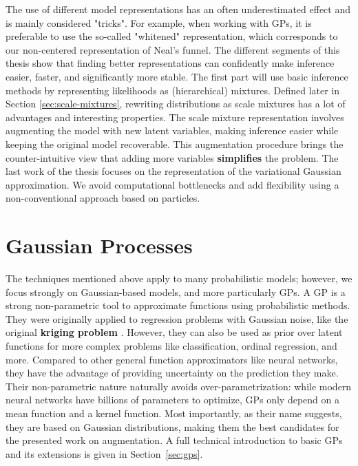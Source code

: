 The use of different model representations has an often underestimated effect and is mainly considered "tricks".
For example, when working with \acf{GPs}, it is preferable to use the so-called "whitened" representation, which corresponds to our non-centered representation of Neal's funnel.
The different segments of this thesis show that finding better representations can confidently make inference easier, faster, and significantly more stable. 
The first part will use basic inference methods by representing likelihoods as (hierarchical) mixtures.
Defined later in Section \ref{sec:scale-mixtures}, rewriting distributions as scale mixtures has a lot of advantages and interesting properties.
The scale mixture representation involves augmenting the model with new latent variables, making inference easier while keeping the original model recoverable.
This augmentation procedure brings the counter-intuitive view that adding more variables \textbf{simplifies} the problem.
The last work of the thesis focuses on the representation of the variational Gaussian approximation.
We avoid computational bottlenecks and add flexibility using a non-conventional approach based on particles.

\section{Gaussian Processes}

The techniques mentioned above apply to many probabilistic models; however, we focus strongly on Gaussian-based models, and more particularly \acf{GPs}.
A \ac{GP} is a strong non-parametric tool to approximate functions using probabilistic methods.
They were originally applied to regression problems with Gaussian noise, like the original \textbf{kriging problem} \cite{cressie1990origins}. However, they can also be used as prior over latent functions for more complex problems like classification, ordinal regression, and more.
Compared to other general function approximators like neural networks, they have the advantage of providing uncertainty on the prediction they make.
Their non-parametric nature naturally avoids over-parametrization: while modern neural networks have billions of parameters to optimize, \ac{GPs} only depend on a mean function and a kernel function.
Most importantly, as their name suggests, they are based on Gaussian distributions, making them the best candidates for the presented work on augmentation.
A full technical introduction to basic \ac{GPs} and its extensions is given in Section~\ref{sec:gps}.

